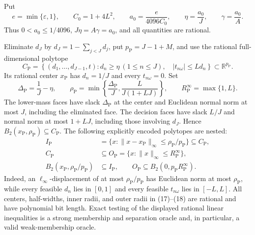 Put
\[
 e=\min\{\varepsilon,1\},
 \qquad C_0=1+4L^2,
 \qquad a_0=\frac{e}{4096C_0},
 \qquad \eta=\frac{a_0}{J},
 \qquad \gamma=\frac{a_0}{A}.
\tag{15}
\]
Thus \(0<a_0\le1/4096\), \(J\eta=A\gamma=a_0\), and all quantities are rational.

Eliminate \(d_J\) by \(d_J=1-\sum_{j<J}d_j\), put \(p_{\mathrm P}=J-1+M\), and use the rational full-dimensional polytope
\[
 C_{\mathrm P}=\left\{(d_1,\ldots,d_{J-1},t):
 d_n\ge\eta\ (1\le n\le J),\quad
 |t_{n\omega}|\le Ld_n\right\}\subset\mathbb R^{p_{\mathrm P}}.
\tag{16}
\]
Its rational center \(x_{\mathrm P}\) has \(d_n=1/J\) and every \(t_{n\omega}=0\).  Set
\[
 \Delta_{\mathrm P}=\frac1J-\eta,
 \qquad
 \rho_{\mathrm P}=\min\left\{\frac{\Delta_{\mathrm P}}J,
                 \frac{L}{J(1+LJ)}\right\},
 \qquad R_{\mathrm P}^{\infty}=\max\{1,L\}.
\tag{17}
\]
The lower-mass faces have slack \(\Delta_{\mathrm P}\) at the center and Euclidean normal norm at most \(J\), including the eliminated face.  The decision faces have slack \(L/J\) and normal norm at most \(1+LJ\), including those involving \(d_J\).  Hence \(B_2(x_{\mathrm P},\rho_{\mathrm P})\subseteq C_{\mathrm P}\).  The following explicitly encoded polytopes are nested:
\[
 \begin{split}
 I_{\mathrm P}
   &=\{x:\|x-x_{\mathrm P}\|_\infty\le\rho_{\mathrm P}/p_{\mathrm P}\}
     \subseteq C_{\mathrm P},\\
 C_{\mathrm P}&\subseteq
 O_{\mathrm P}=\{x:\|x\|_\infty\le R_{\mathrm P}^{\infty}\},\\
 B_2(x_{\mathrm P},\rho_{\mathrm P}/p_{\mathrm P})
   &\subseteq I_{\mathrm P},
 \qquad
 O_{\mathrm P}\subseteq B_2(0,p_{\mathrm P}R_{\mathrm P}^{\infty}).
 \end{split}
\tag{18}
\]
Indeed, an \(\ell_\infty\)-displacement of at most \(\rho_{\mathrm P}/p_{\mathrm P}\) has Euclidean norm at most \(\rho_{\mathrm P}\), while every feasible \(d_n\) lies in \([0,1]\) and every feasible \(t_{n\omega}\) lies in \([-L,L]\).  All centers, half-widths, inner radii, and outer radii in (17)--(18) are rational and have polynomial bit length.  Exact testing of the displayed rational linear inequalities is a strong membership and separation oracle and, in particular, a valid weak-membership oracle.

